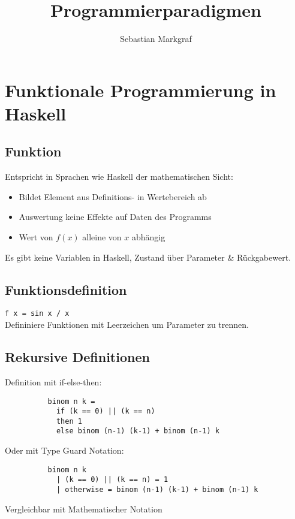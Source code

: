 \documentclass[10pt,a4paper,draft]{article}
\author{Sebastian Markgraf}
\title{Programmierparadigmen}
\def\code#1{\texttt{#1}}
\begin{document}
	{\let\newpage\relax\maketitle}
	\tableofcontents
	\newpage
	\setcounter{page}{1}

        \section{Funktionale Programmierung in Haskell}

        \subsection{Funktion}
        Entspricht in Sprachen wie Haskell der mathematischen Sicht:
        \begin{itemize}
          \item Bildet Element aus Definitions- in Wertebereich ab
          \item Auswertung keine Effekte auf Daten des Programms
          \item Wert von \(f(x)\) alleine von \(x\) abhängig
        \end{itemize}
        Es gibt keine Variablen in Haskell, Zustand über Parameter \& Rückgabewert.  

        \subsection{Funktionsdefinition}
        \code{f x = sin x / x}\\
        Defininiere Funktionen mit Leerzeichen um Parameter zu trennen.\\

        
        \subsection{Rekursive Definitionen}
        Definition mit if-else-then:
        \begin{lstlisting}
          binom n k =
            if (k == 0) || (k == n)
            then 1
            else binom (n-1) (k-1) + binom (n-1) k
        \end{lstlisting}
        Oder mit Type Guard Notation:
        \begin{lstlisting}
          binom n k
            | (k == 0) || (k == n) = 1
            | otherwise = binom (n-1) (k-1) + binom (n-1) k
        \end{lstlisting}
        Vergleichbar mit Mathematischer Notation
\end{document}
